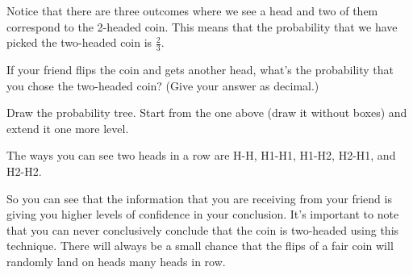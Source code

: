 \documentclass{ximera}
\begin{document}
\begin{image}
\end{image}

Notice that there are three outcomes where we see a head and two of them correspond to the 2-headed coin. This means that the probability that we have picked the two-headed coin is $\frac{2}{3}$.

\begin{question}
If your friend flips the coin and gets another head, what's the probability that you chose the two-headed coin? (Give your answer as decimal.)
  \begin{solution}
    \begin{hint}
      Draw the probability tree. Start from the one above (draw it without boxes) and extend it one more level.
    \end{hint}
    \begin{hint}
      The ways you can see two heads in a row are H-H, H1-H1, H1-H2, H2-H1, and H2-H2.
    \end{hint}
  \end{solution}
\end{question}

So you can see that the information that you are receiving from your friend is giving you higher levels of confidence in your conclusion. It's important to note that you can never conclusively conclude that the coin is two-headed using this technique. There will always be a small chance that the flips of a fair coin will randomly land on heads many heads in row.
\end{document}
